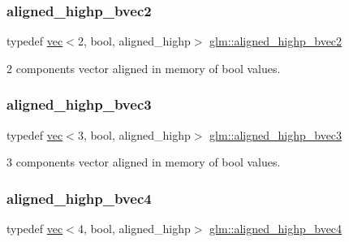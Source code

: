 \subsubsection{\texorpdfstring{aligned\+\_\+highp\+\_\+bvec2}{aligned\_highp\_bvec2}}
{\footnotesize\ttfamily typedef \mbox{\hyperlink{structglm_1_1vec}{vec}}$<$2, bool, aligned\+\_\+highp$>$ \mbox{\hyperlink{group__gtc__type__aligned_gafa71bded1fc2dd68608207de49a96870}{glm\+::aligned\+\_\+highp\+\_\+bvec2}}}



2 components vector aligned in memory of bool values. 

\mbox{\label{group__gtc__type__aligned_ga224220a3fc5e5220141a568270cfb405}} 
\subsubsection{\texorpdfstring{aligned\+\_\+highp\+\_\+bvec3}{aligned\_highp\_bvec3}}
{\footnotesize\ttfamily typedef \mbox{\hyperlink{structglm_1_1vec}{vec}}$<$3, bool, aligned\+\_\+highp$>$ \mbox{\hyperlink{group__gtc__type__aligned_ga224220a3fc5e5220141a568270cfb405}{glm\+::aligned\+\_\+highp\+\_\+bvec3}}}



3 components vector aligned in memory of bool values. 

\mbox{\label{group__gtc__type__aligned_ga833e4cd7402677f8ca56795a12d8bec0}} 
\subsubsection{\texorpdfstring{aligned\+\_\+highp\+\_\+bvec4}{aligned\_highp\_bvec4}}
{\footnotesize\ttfamily typedef \mbox{\hyperlink{structglm_1_1vec}{vec}}$<$4, bool, aligned\+\_\+highp$>$ \mbox{\hyperlink{group__gtc__type__aligned_ga833e4cd7402677f8ca56795a12d8bec0}{glm\+::aligned\+\_\+highp\+\_\+bvec4}}}



